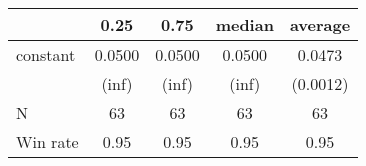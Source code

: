 \begin{tabular}{lcccc}
\hline
         &  0.25  &  0.75  & median & average   \\
\midrule
\midrule
constant & 0.0500 & 0.0500 & 0.0500 & 0.0473    \\
         & (inf)  & (inf)  & (inf)  & (0.0012)  \\
N        & 63     & 63     & 63     & 63        \\
Win rate & 0.95   & 0.95   & 0.95   & 0.95      \\
\hline
\end{tabular}
